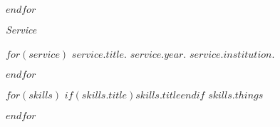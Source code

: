 \documentclass[11pt,article,oneside]{memoir}
\begin{document}
$endfor$

\medskip

\ind \emph{Service}

\smallskip

$for(service)$
\ind $service.title$. $service.year$. $service.institution$.

\pagebreak[1]
$endfor$

\smallskip
\bigskip
\pagebreak[1]


$for(skills)$
\ind$if(skills.title)$\textbf{$skills.title$}$endif$ $skills.things$

\smallskip

\pagebreak[1]
$endfor$

\bigskip

\thispagestyle{jtmcolophon}
\end{document}
